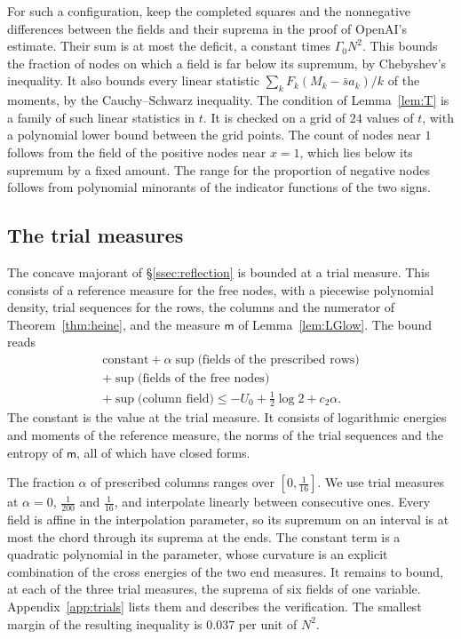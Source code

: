 \documentclass[11pt]{amsart}
\theoremstyle{definition}
\theoremstyle{remark}
\numberwithin{equation}{section}
\begin{document}
For such a configuration, keep the completed squares and the nonnegative differences between the fields and
their suprema in the proof of OpenAI's estimate. Their sum is at most the deficit, a constant times
$\Gamma_0N^2$. This bounds the fraction of nodes on which a field is far below its supremum, by Chebyshev's
inequality. It also bounds every linear statistic $\sum_kF_k(M_k-\bar sa_k)/k$ of the moments, by the
Cauchy--Schwarz inequality. The condition of Lemma~\ref{lem:T} is a family of such linear statistics in $t$. It
is checked on a grid of $24$ values of $t$, with a polynomial lower bound between the grid points. The count
of nodes near $1$ follows from the field of the positive nodes near $x=1$, which lies below its supremum by a
fixed amount. The range for the proportion of negative nodes follows from polynomial minorants of the
indicator functions of the two signs.

\subsection{The trial measures}\label{ssec:signedcert}
The concave majorant of \S\ref{ssec:reflection} is bounded at a trial measure. This consists of a reference
measure for the free nodes, with a piecewise polynomial density, trial sequences for the rows, the columns
and the numerator of Theorem~\ref{thm:heine}, and the measure $\mathsf m$ of Lemma~\ref{lem:LGlow}. The bound
reads
\begin{multline*}
 \text{constant}+\alpha\sup\text{(fields of the prescribed rows)}\\
 +\sup\text{(fields of the free nodes)}\\
 +\sup\text{(column field)}\le-U_0+\tfrac12\log2+c_2\alpha .
\end{multline*}
The constant is the value at the trial measure. It consists of logarithmic energies and moments of the
reference measure, the norms of the trial sequences and the entropy of $\mathsf m$, all of which have closed
forms.

The fraction $\alpha$ of prescribed columns ranges over $[0,\frac1{16}]$. We use trial measures at $\alpha=0$,
$\frac1{200}$ and $\frac1{16}$, and interpolate linearly between consecutive ones. Every field is affine in the
interpolation parameter, so its supremum on an interval is at most the chord through its suprema at the
ends. The constant term is a quadratic polynomial in the parameter, whose curvature is an explicit
combination of the cross energies of the two end measures. It remains to bound, at each of the three trial
measures, the suprema of six fields of one variable. Appendix~\ref{app:trials} lists them and describes the
verification. The smallest margin of the resulting inequality is $0.037$ per unit of $N^2$.
\end{document}
